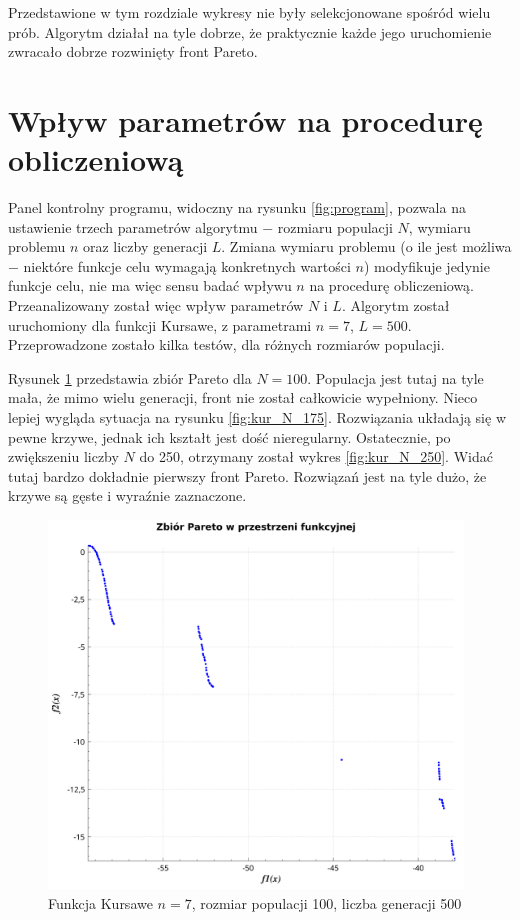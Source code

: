 \documentclass[11pt,a4paper]{article}
\begin{document}
Przedstawione w tym rozdziale wykresy nie były selekcjonowane spośród wielu prób. Algorytm działał na tyle dobrze, że praktycznie każde jego uruchomienie zwracało dobrze rozwinięty front Pareto. 

\section{Wpływ parametrów na procedurę obliczeniową}

Panel kontrolny programu, widoczny na rysunku \ref{fig:program}, pozwala na ustawienie trzech parametrów algorytmu $-$ rozmiaru populacji $N$, wymiaru problemu $n$ oraz liczby generacji $L$. Zmiana wymiaru problemu (o ile jest możliwa $-$ niektóre funkcje celu wymagają konkretnych wartości $n$) modyfikuje jedynie funkcje celu, nie ma więc sensu badać wpływu $n$ na procedurę obliczeniową. Przeanalizowany został więc wpływ parametrów $N$ i $L$. Algorytm został uruchomiony dla funkcji Kursawe, z parametrami $n = 7$, $L = 500$. Przeprowadzone zostało kilka testów, dla różnych rozmiarów populacji. 

Rysunek \ref{fig:kur_N_100} przedstawia zbiór Pareto dla $N = 100$. Populacja jest tutaj na tyle mała, że mimo wielu generacji, front nie został całkowicie wypełniony. Nieco lepiej wygląda sytuacja na rysunku \ref{fig:kur_N_175}. Rozwiązania układają się w pewne krzywe, jednak ich kształt jest dość nieregularny. Ostatecznie, po zwiększeniu liczby $N$ do 250, otrzymany został wykres \ref{fig:kur_N_250}. Widać tutaj bardzo dokładnie pierwszy front Pareto. Rozwiązań jest na tyle dużo, że krzywe są gęste i wyraźnie zaznaczone. 
\begin{figure}[H]
\centering
\includegraphics[width=11cm]{kur_N_100}
\caption{Funkcja Kursawe $n = 7$, rozmiar populacji 100, liczba generacji 500}
\label{fig:kur_N_100}
\end{figure}
\end{document}
